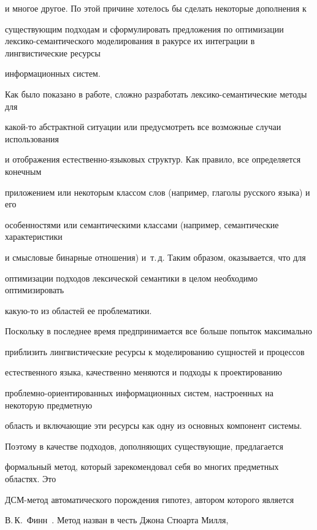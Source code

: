 и многое другое. По этой причине хотелось бы сделать некоторые дополнения к 


существующим подходам и сформулировать предложения по оптимизации лек\-си\-ко-се\-ман\-ти\-че\-ско\-го моделирования в ракурсе их интеграции в лингвистические ресурсы 


информационных систем.


   


   Как было показано в работе, сложно разработать лексико-семантические методы для 


какой-то абстрактной ситуации или предусмотреть все возможные случаи использования 


и отображения естественно-языковых структур. Как правило, все определяется конечным 


приложением или некоторым классом слов (например, глаголы русского языка) и его 


особенностями или семантическими классами (например, семантические характеристики 


и смысловые бинарные отношения) и~т.\,д. Таким образом, оказывается, что для 


оптимизации подходов лексической семантики в целом необходимо оптимизировать 


какую-то из областей ее проблематики.


   


   Поскольку в последнее время предпринимается все больше попыток максимально 


приблизить лингвистические ресурсы к моделированию сущностей и процессов 


естественного языка, качественно меняются и подходы к проектированию 


проблемно-ориентированных информационных систем, настроенных на некоторую предметную 


область и включающие эти ресурсы как одну из основных компонент системы.


   


   Поэтому в качестве подходов, дополняющих существующие, предлагается 


формальный метод, который зарекомендовал себя во многих предметных областях. Это 


ДСМ-метод автоматического порождения гипотез, автором которого является 


В.\,К.~Финн~\cite{42-2-11, 41-2-11}. Метод назван в честь Джона Стюарта Милля, 


